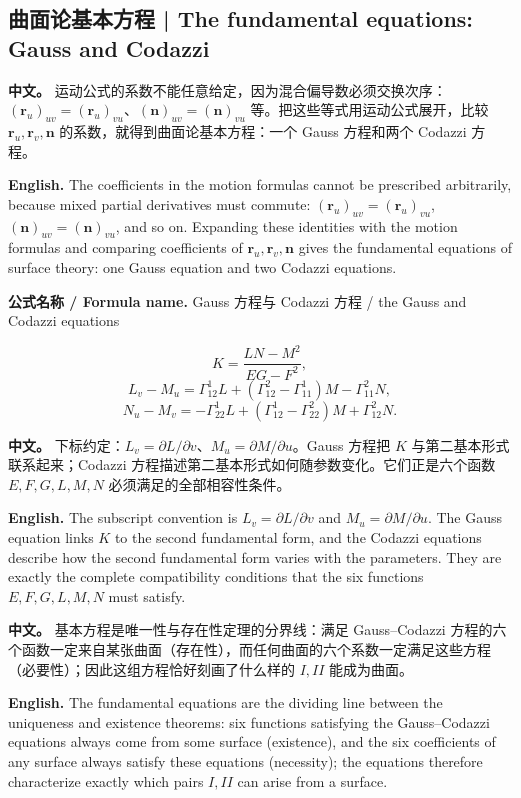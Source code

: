 \documentclass[UTF8,11pt,a4paper]{ctexart}
\newcommand{\APS}[2]{\par\noindent\textbf{中文。} #1\par\noindent\textbf{English.} #2\par\smallskip}
\newcommand{\FORMULA}[2]{\par\noindent\textbf{公式名称 / Formula name.} #1 / #2\par}
\newcommand{\br}{\mathbf{r}}
\newcommand{\bn}{\mathbf{n}}
\begin{document}
\subsection{曲面论基本方程 | The fundamental equations: Gauss and Codazzi}
\APS{运动公式的系数不能任意给定，因为混合偏导数必须交换次序：$(\br_u)_{uv}=(\br_u)_{vu}$、$(\bn)_{uv}=(\bn)_{vu}$ 等。把这些等式用运动公式展开，比较 $\br_u,\br_v,\bn$ 的系数，就得到曲面论基本方程：一个 Gauss 方程和两个 Codazzi 方程。}{The coefficients in the motion formulas cannot be prescribed arbitrarily, because mixed partial derivatives must commute: $(\br_u)_{uv}=(\br_u)_{vu}$, $(\bn)_{uv}=(\bn)_{vu}$, and so on. Expanding these identities with the motion formulas and comparing coefficients of $\br_u,\br_v,\bn$ gives the fundamental equations of surface theory: one Gauss equation and two Codazzi equations.}
\FORMULA{Gauss 方程与 Codazzi 方程}{the Gauss and Codazzi equations}
\[
K=\frac{LN-M^2}{EG-F^2},
\]
\[
L_v-M_u=\Gamma^1_{12}L+\left(\Gamma^2_{12}-\Gamma^1_{11}\right)M-\Gamma^2_{11}N,
\]
\[
N_u-M_v=-\Gamma^1_{22}L+\left(\Gamma^1_{12}-\Gamma^2_{22}\right)M+\Gamma^2_{12}N .
\]
\APS{下标约定：$L_v=\partial L/\partial v$、$M_u=\partial M/\partial u$。Gauss 方程把 $K$ 与第二基本形式联系起来；Codazzi 方程描述第二基本形式如何随参数变化。它们正是六个函数 $E,F,G,L,M,N$ 必须满足的全部相容性条件。}{The subscript convention is $L_v=\partial L/\partial v$ and $M_u=\partial M/\partial u$. The Gauss equation links $K$ to the second fundamental form, and the Codazzi equations describe how the second fundamental form varies with the parameters. They are exactly the complete compatibility conditions that the six functions $E,F,G,L,M,N$ must satisfy.}
\APS{基本方程是唯一性与存在性定理的分界线：满足 Gauss--Codazzi 方程的六个函数一定来自某张曲面（存在性），而任何曲面的六个系数一定满足这些方程（必要性）；因此这组方程恰好刻画了什么样的 $I,II$ 能成为曲面。}{The fundamental equations are the dividing line between the uniqueness and existence theorems: six functions satisfying the Gauss--Codazzi equations always come from some surface (existence), and the six coefficients of any surface always satisfy these equations (necessity); the equations therefore characterize exactly which pairs $I,II$ can arise from a surface.}
\end{document}
